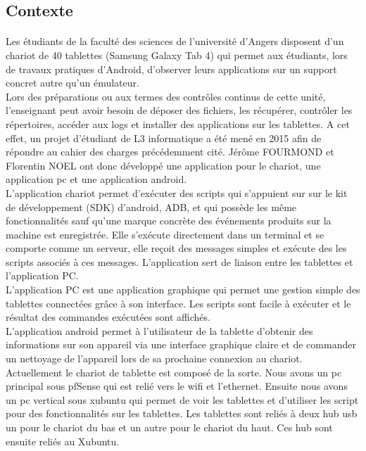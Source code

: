 \documentclass[a4paper,12pt]{extarticle}
\begin{document}
\subsection{Contexte}
\paragraph{}
Les étudiants de la faculté des sciences de l’université d’Angers disposent d’un chariot de 40 tablettes (Samsung Galaxy Tab 4) qui permet aux étudiants, lors de travaux pratiques d’Android, d’observer leurs applications sur un support concret autre qu’un émulateur.\\


Lors des préparations ou aux termes des contrôles continus de cette unité, l’enseignant peut avoir besoin de déposer des fichiers, les récupérer, contrôler les répertoires, accéder aux logs et installer des applications sur les tablettes.
A cet effet, un projet d’étudiant de L3 informatique a été mené en 2015 afin de répondre au cahier des charges précédemment cité. Jérôme FOURMOND et Florentin NOEL ont donc développé une application pour le chariot, une application pc et une application android.\\

L’application chariot permet d’exécuter des scripts qui s’appuient sur sur le kit de développement (SDK) d’android, ADB, et qui possède les même fonctionnalités sauf qu’une marque concrète des événements produits sur la machine est enregistrée.  Elle s'exécute directement dans un terminal et  se comporte comme un serveur, elle reçoit des messages simples et exécute des les scripts associés à ces messages. L’application sert de liaison entre les tablettes et l’application PC.\\

L’application PC est une application graphique qui permet une gestion simple des tablettes connectées grâce à son interface. Les scripts sont facile à exécuter et le résultat des commandes exécutées sont affichés. \\

L’application android permet à l’utilisateur de la tablette d’obtenir des informations sur son appareil via une interface graphique claire et de commander un nettoyage de l'appareil lors de sa prochaine connexion au chariot.\\

Actuellement le chariot de tablette est composé de la sorte. Nous avons un pc principal sous pfSense qui est relié vers le wifi et l’ethernet. Ensuite nous avons un pc vertical sous xubuntu qui permet de voir les tablettes et d’utiliser les script pour des fonctionnalités sur les tablettes. Les tablettes sont reliés à deux hub usb un pour le chariot du bas et un autre pour le chariot du haut. Ces hub sont ensuite reliés au Xubuntu.\\
\end{document}
